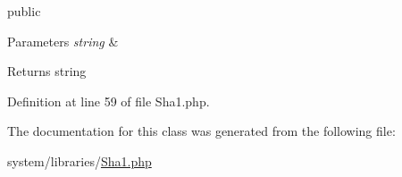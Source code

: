 public 
\begin{DoxyParams}{Parameters}
{\em string} & \\
\hline
\end{DoxyParams}
\begin{DoxyReturn}{Returns}
string 
\end{DoxyReturn}


Definition at line 59 of file Sha1.\-php.



The documentation for this class was generated from the following file\-:\begin{DoxyCompactItemize}
\item 
system/libraries/\hyperlink{_sha1_8php}{Sha1.\-php}\end{DoxyCompactItemize}

